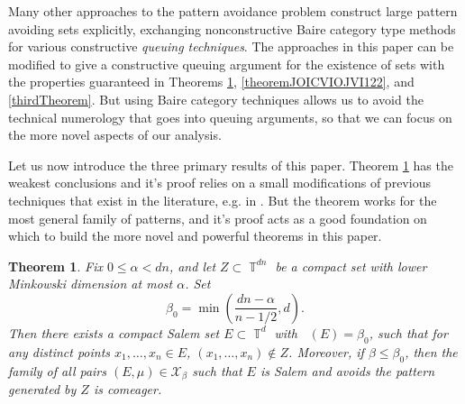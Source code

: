\documentclass[dvipsnames,letterpaper,12pt]{article}
\numberwithin{equation}{section}
\DeclareMathOperator{\fordim}{\dim_{\mathbb{F}}}
\DeclareMathOperator{\TT}{\mathbb{T}}
\newtheorem{theorem}{Theorem}
\numberwithin{theorem}{section}
\begin{document}
Many other approaches \cite{OurPaper,PramanikFraser,Keleti} to the pattern avoidance problem construct large pattern avoiding sets explicitly, exchanging nonconstructive Baire category type methods for various constructive \emph{queuing techniques}. The approaches in this paper can be modified to give a constructive queuing argument for the existence of sets with the properties guaranteed in Theorems \ref{maintheorem}, \ref{theoremJOICVIOJVI122}, and \ref{thirdTheorem}. But using Baire category techniques allows us to avoid the technical numerology that goes into queuing arguments, so that we can focus on the more novel aspects of our analysis.



Let us now introduce the three primary results of this paper. Theorem \ref{maintheorem} has the weakest conclusions and it's proof relies on a small modifications of previous techniques that exist in the literature, e.g. in \cite{Korner1}. But the theorem works for the most general family of patterns, and it's proof acts as a good foundation on which to build the more novel and powerful theorems in this paper.

\begin{theorem} \label{maintheorem}
    Fix $0 \leq \alpha < dn$, and let $Z \subset \TT^{dn}$ be a compact set with lower Minkowski dimension at most $\alpha$. Set
    \[ \beta_0 = \min \left( \frac{dn - \alpha}{n-1/2}, d \right). \]
    Then there exists a compact Salem set $E \subset \TT^d$ with $\fordim(E) = \beta_0$, such that for any distinct points $x_1, \dots, x_n \in E$, $(x_1, \dots, x_n) \not \in Z$. Moreover, if $\beta \leq \beta_0$, then the family of all pairs $(E,\mu) \in \mathcal{X}_\beta$ such that $E$ is Salem and avoids the pattern generated by $Z$ is comeager.
\end{theorem}
\end{document}

